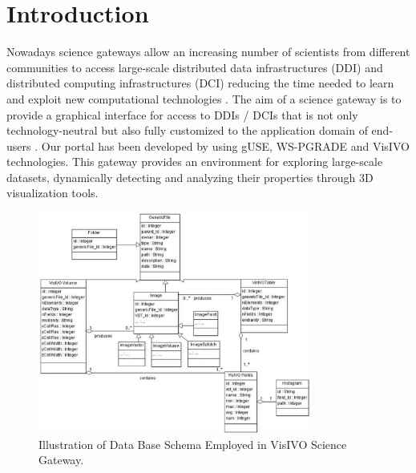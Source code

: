 \section{Introduction}
Nowadays science gateways allow an increasing number of scientists from different communities to access large-scale distributed data infrastructures (DDI) and distributed computing infrastructures (DCI) reducing the time needed to learn and exploit new computational technologies \citep{borkin2011visualization}. The aim of a science gateway is to provide a graphical interface for access to DDIs / DCIs that is not only technology-neutral but also fully customized to the application domain of end-users \citep{abt_1990}. Our portal has been developed by using gUSE, WS-PGRADE  \citep{kacsuk2011p}  and VisIVO \citep{becciani2010visivo} technologies. This gateway provides an environment for exploring large-scale datasets, dynamically detecting and analyzing their properties through 3D visualization tools. 

\begin{figure}
\begin{center}
\includegraphics[width=0.8\textwidth]{part5/Costa_O08/O08_f2.eps}
\caption{Illustration of Data Base Schema Employed in VisIVO Science Gateway.}
\label{fg1}
\end{center}
\end{figure}

